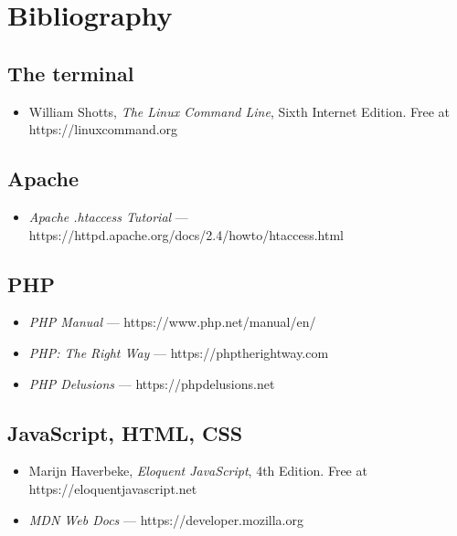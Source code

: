 \documentclass[11pt,a4paper,oneside]{book}
\providecommand{\tightlist}{%
  \setlength{\itemsep}{0pt}\setlength{\parskip}{0pt}}
\begin{document}
\newpage

\hypertarget{bibliography}{%
\chapter{Bibliography}\label{bibliography}}

\hypertarget{the-terminal-1}{%
\section{The terminal}\label{the-terminal-1}}

\begin{itemize}
\tightlist
\item
  William Shotts, \emph{The Linux Command Line}, Sixth Internet
  Edition. Free at https://linuxcommand.org
\end{itemize}

\hypertarget{apache}{%
\section{Apache}\label{apache}}

\begin{itemize}
\tightlist
\item
  \emph{Apache .htaccess Tutorial} ---
  https://httpd.apache.org/docs/2.4/howto/htaccess.html
\end{itemize}

\hypertarget{php}{%
\section{PHP}\label{php}}

\begin{itemize}
\tightlist
\item
  \emph{PHP Manual} --- https://www.php.net/manual/en/
\item
  \emph{PHP: The Right Way} --- https://phptherightway.com
\item
  \emph{PHP Delusions} --- https://phpdelusions.net
\end{itemize}

\hypertarget{javascript-html-css}{%
\section{JavaScript, HTML, CSS}\label{javascript-html-css}}

\begin{itemize}
\tightlist
\item
  Marijn Haverbeke, \emph{Eloquent JavaScript}, 4th Edition. Free
  at https://eloquentjavascript.net
\item
  \emph{MDN Web Docs} --- https://developer.mozilla.org
\end{itemize}
\end{document}
